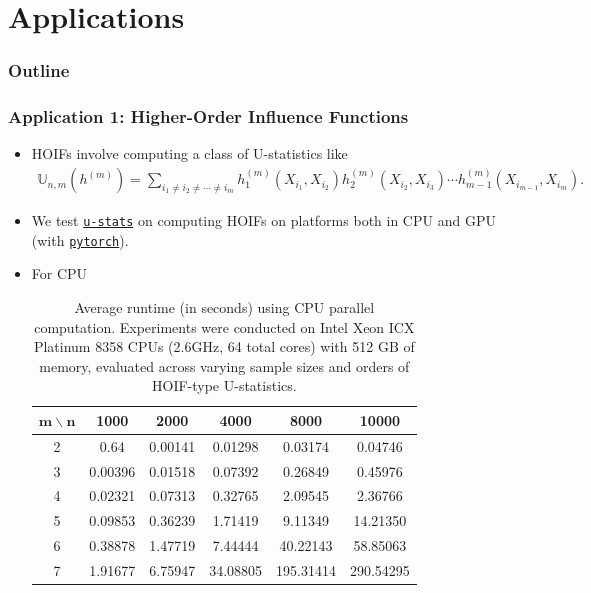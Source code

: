 \documentclass[9pt]{beamer}
\theoremstyle{mystyle}
\theoremstyle{mystyletwo}
\newcommand{\bbU}{{\mathbb{U}}}
\newcommand{\libref}[2]{\href{#2}{\texttt{#1}}}
\newcommand{\torch}{\libref{pytorch}{https://pytorch.org/}}
\def\package{\libref{u-stats}{https://github.com/Amedar-Asterisk/U-Statistics-python}}
\begin{document}
\section{Applications}
\begin{frame}
    \frametitle{Outline}
    \tableofcontents[currentsection, sectionstyle=show/shaded, subsectionstyle=show/shaded/shaded]
\end{frame}
\begin{frame}
    \frametitle{Application 1: Higher-Order Influence Functions}
    \begin{itemize}
        \item HOIFs involve computing a class of U-statistics like
              \begin{align*}
                  \bbU_{n,m}(h^{(m)}) = \sum_{i_1 \neq i_2 \neq \cdots \neq i_m} h^{(m)}_1(X_{i_1}, X_{i_2}) h^{(m)}_2(X_{i_2}, X_{i_3}) \cdots h^{(m)}_{m-1}(X_{i_{m-1}}, X_{i_m}).
              \end{align*}
        \item We test \package{} on computing HOIFs on platforms both in CPU and GPU (with \torch).
        \item For CPU
              \begin{table}[htbp]
                  \centering
                  \caption{Average runtime (in seconds) using CPU parallel computation. Experiments were conducted on Intel Xeon ICX Platinum 8358 CPUs (2.6GHz, 64 total cores) with 512 GB of memory, evaluated across varying sample sizes and orders of HOIF-type U-statistics.}
                  \label{tab:HOIF_CPU}
                  \begin{tabular}{cccccc}
                      \toprule
                      $\bm{m} \backslash \bm{n}$ & \textbf{1000} & \textbf{2000} & \textbf{4000} & \textbf{8000} & \textbf{10000} \\
                      \midrule
                      2                          & 0.64          & 0.00141       & 0.01298       & 0.03174       & 0.04746        \\
                      3                          & 0.00396       & 0.01518       & 0.07392       & 0.26849       & 0.45976        \\
                      4                          & 0.02321       & 0.07313       & 0.32765       & 2.09545       & 2.36766        \\
                      5                          & 0.09853       & 0.36239       & 1.71419       & 9.11349       & 14.21350       \\
                      6                          & 0.38878       & 1.47719       & 7.44444       & 40.22143      & 58.85063       \\
                      7                          & 1.91677       & 6.75947       & 34.08805      & 195.31414     & 290.54295      \\
                      \bottomrule
                  \end{tabular}
              \end{table}
    \end{itemize}
\end{frame}
\end{document}
